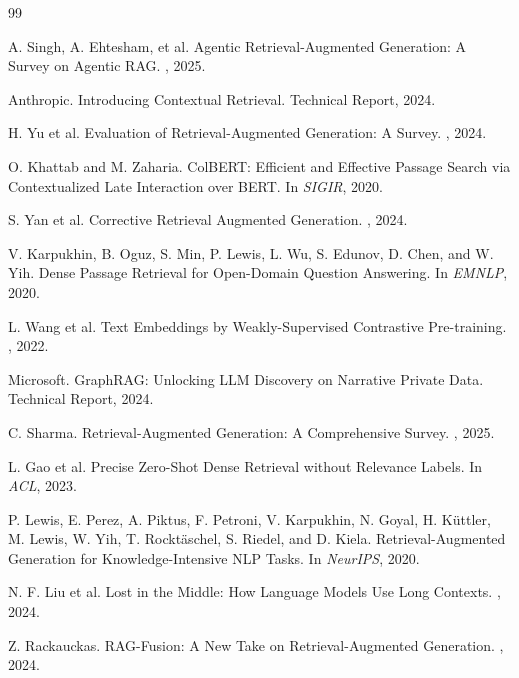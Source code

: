 \documentclass[11pt]{book}
\begin{document}
\begin{thebibliography}{99}

A. Singh, A. Ehtesham, et al.
\newblock Agentic Retrieval-Augmented Generation: A Survey on Agentic RAG.
, 2025.

Anthropic.
\newblock Introducing Contextual Retrieval.
\newblock Technical Report, 2024.

H. Yu et al.
\newblock Evaluation of Retrieval-Augmented Generation: A Survey.
, 2024.

O. Khattab and M. Zaharia.
\newblock ColBERT: Efficient and Effective Passage Search via Contextualized Late Interaction over BERT.
\newblock In {\em SIGIR}, 2020.

S. Yan et al.
\newblock Corrective Retrieval Augmented Generation.
, 2024.

V. Karpukhin, B. Oguz, S. Min, P. Lewis, L. Wu, S. Edunov, D. Chen, and W. Yih.
\newblock Dense Passage Retrieval for Open-Domain Question Answering.
\newblock In {\em EMNLP}, 2020.

L. Wang et al.
\newblock Text Embeddings by Weakly-Supervised Contrastive Pre-training.
, 2022.

Microsoft.
\newblock GraphRAG: Unlocking LLM Discovery on Narrative Private Data.
\newblock Technical Report, 2024.

C. Sharma.
\newblock Retrieval-Augmented Generation: A Comprehensive Survey.
, 2025.

L. Gao et al.
\newblock Precise Zero-Shot Dense Retrieval without Relevance Labels.
\newblock In {\em ACL}, 2023.

P. Lewis, E. Perez, A. Piktus, F. Petroni, V. Karpukhin, N. Goyal, H. Küttler, M. Lewis, W. Yih, T. Rocktäschel, S. Riedel, and D. Kiela.
\newblock Retrieval-Augmented Generation for Knowledge-Intensive NLP Tasks.
\newblock In {\em NeurIPS}, 2020.

N. F. Liu et al.
\newblock Lost in the Middle: How Language Models Use Long Contexts.
, 2024.

Z. Rackauckas.
\newblock RAG-Fusion: A New Take on Retrieval-Augmented Generation.
, 2024.


\end{thebibliography}
\end{document}
